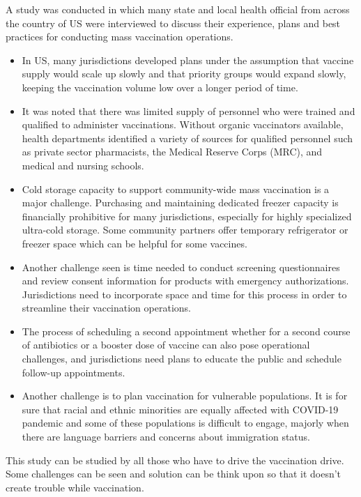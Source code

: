 \documentclass[10pt,twocolumn,letterpaper]{article}
\begin{document}
A study was conducted in which many state and local health official from across the country of US were interviewed to discuss their experience, plans and best practices for conducting mass vaccination operations. ~\cite{Alpher06}
\begin{itemize}
    \item In US, many jurisdictions developed plans under the assumption that vaccine supply would scale up slowly and that priority groups would expand slowly, keeping the vaccination volume low over a longer period of time. ~\cite{Alpher06}
    \item It was noted that there was limited supply of personnel who were trained and qualified to administer vaccinations. Without organic vaccinators available, health departments identified a variety of sources for qualified personnel such as private sector pharmacists, the Medical Reserve Corps (MRC), and medical and nursing schools.~\cite{Alpher06}
    \item Cold storage capacity to support community-wide mass vaccination is a major challenge. Purchasing and maintaining dedicated freezer capacity is financially prohibitive for many jurisdictions, especially for highly specialized ultra-cold storage. Some community partners offer temporary refrigerator or freezer space which can be helpful for some vaccines.~\cite{Alpher06} 
    \item Another challenge seen is time needed to conduct screening questionnaires and review consent information for products with emergency authorizations. Jurisdictions need to incorporate space and time for this process in order to streamline their vaccination operations.~\cite{Alpher06}
    \item  The process of scheduling a second appointment whether for a second course of antibiotics or a booster dose of vaccine can also pose operational challenges, and jurisdictions need plans to educate the public and schedule follow-up appointments.
    \item Another challenge is to plan vaccination for vulnerable populations. It is for sure that racial and ethnic minorities are equally affected with COVID-19 pandemic and some of these populations is difficult to engage, majorly when there are language barriers and concerns about immigration status.~\cite{Alpher06}
\end{itemize}
This study can be studied by all those who have to drive the vaccination drive. Some challenges can be seen and solution can be think upon so that it doesn't create trouble while vaccination.
\end{document}
